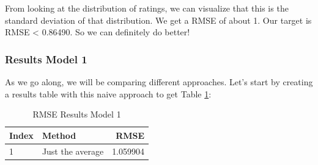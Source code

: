 \documentclass[
]{article}
\newenvironment{Shaded}{}{}
\newcommand{\DecValTok}[1]{\textcolor[rgb]{0.25,0.63,0.44}{#1}}
\newcommand{\FloatTok}[1]{\textcolor[rgb]{0.25,0.63,0.44}{#1}}
\newcommand{\FunctionTok}[1]{\textcolor[rgb]{0.02,0.16,0.49}{#1}}
\newcommand{\NormalTok}[1]{#1}
\newcommand{\OtherTok}[1]{\textcolor[rgb]{0.00,0.44,0.13}{#1}}
\newcommand{\SpecialCharTok}[1]{\textcolor[rgb]{0.25,0.44,0.63}{#1}}
\begin{document}
\begin{Shaded}
\end{Shaded}

From looking at the distribution of ratings, we can visualize that this
is the standard deviation of that distribution. We get a RMSE of about
1. Our target is RMSE \textless{} 0.86490. So we can definitely do
better!

\newpage

\hypertarget{results-model-1}{%
\subsubsection{Results Model 1}\label{results-model-1}}

As we go along, we will be comparing different approaches. Let's start
by creating a results table with this naive approach to get Table
\ref{tbl:rmse_results_model_1}:

\begin{table}[H]

\caption{\label{tab:m_1_4}RMSE Results Model 1\label{tbl:rmse_results_model_1}}
\centering
\fontsize{7}{9}\selectfont
\begin{tabular}[t]{llr}
\toprule
Index & Method & RMSE\\
\midrule
1 & Just the average & 1.059904\\
\bottomrule
\end{tabular}
\end{table}
\end{document}

